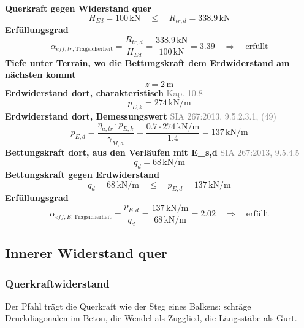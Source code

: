 \documentclass[11pt,a4paper]{article}
\newcommand{\normref}[1]{{\small\textcolor{gray}{#1}}}
\begin{document}
\noindent\textbf{Querkraft gegen Widerstand quer}
\begin{equation*}
H_{Ed} = 100\,\mathrm{kN} \quad \le \quad R_{tr,d} = 338.9\,\mathrm{kN}
\end{equation*}
\noindent\textbf{Erfüllungsgrad}
\begin{equation*}
\alpha_{eff,tr,\text{Tragsicherheit}} = \frac{R_{tr,d}}{H_{Ed}} = \frac{338.9\,\mathrm{kN}}{100\,\mathrm{kN}} = 3.39 \quad \Rightarrow \quad \text{erfüllt}
\end{equation*}
\noindent\textbf{Tiefe unter Terrain, wo die Bettungskraft dem Erdwiderstand am nächsten kommt}
\begin{equation*}
z = 2\,\mathrm{m}
\end{equation*}
\noindent\textbf{Erdwiderstand dort, charakteristisch} \hfill \normref{Kap. 10.8}
\begin{equation*}
p_{E,k} = 274\,\mathrm{kN}/\mathrm{m}
\end{equation*}
\noindent\textbf{Erdwiderstand dort, Bemessungswert} \hfill \normref{SIA 267:2013, 9.5.2.3.1, (49)}
\begin{equation*}
p_{E,d} = \frac{\eta_{a,tr} \cdot p_{E,k}}{\gamma_{M,a}} = \frac{0.7 \cdot 274\,\mathrm{kN}/\mathrm{m}}{1.4} = 137\,\mathrm{kN}/\mathrm{m}
\end{equation*}
\noindent\textbf{Bettungskraft dort, aus den Verläufen mit E\_s,d} \hfill \normref{SIA 267:2013, 9.5.4.5}
\begin{equation*}
q_d = 68\,\mathrm{kN}/\mathrm{m}
\end{equation*}
\noindent\textbf{Bettungskraft gegen Erdwiderstand}
\begin{equation*}
q_d = 68\,\mathrm{kN}/\mathrm{m} \quad \le \quad p_{E,d} = 137\,\mathrm{kN}/\mathrm{m}
\end{equation*}
\noindent\textbf{Erfüllungsgrad}
\begin{equation*}
\alpha_{eff,E,\text{Tragsicherheit}} = \frac{p_{E,d}}{q_d} = \frac{137\,\mathrm{kN}/\mathrm{m}}{68\,\mathrm{kN}/\mathrm{m}} = 2.02 \quad \Rightarrow \quad \text{erfüllt}
\end{equation*}
\subsection{Innerer Widerstand quer}
\subsubsection{Querkraftwiderstand}
Der Pfahl trägt die Querkraft wie der Steg eines Balkens: schräge Druckdiagonalen im Beton, die Wendel als Zugglied, die Längsstäbe als Gurt.
\end{document}
